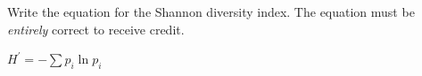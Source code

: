 \bonusquestion[2]
Write the equation for the Shannon diversity index. The equation must be \emph{entirely} correct to receive credit.

\ifprintanswers $H^\prime = -\sum p_i \ln p_i$ \fi